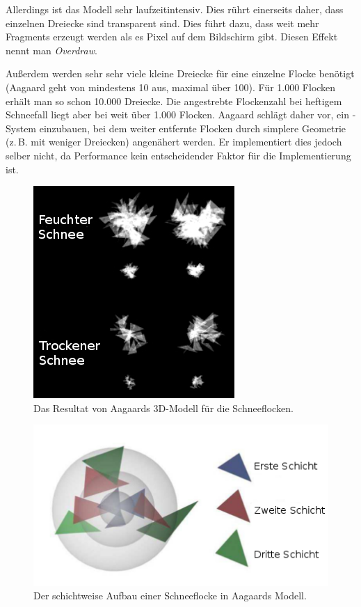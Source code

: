 Allerdings ist das Modell sehr laufzeitintensiv. Dies rührt einerseits
daher, dass einzelnen Dreiecke sind transparent sind. Dies führt dazu,
dass weit mehr Fragments erzeugt werden als es Pixel auf dem
Bildschirm gibt. Diesen Effekt nennt man \emph{Overdraw}.

Außerdem werden sehr sehr viele kleine Dreiecke für eine einzelne
Flocke benötigt (Aagaard geht von mindestens 10 aus, maximal über
100). Für 1.000 Flocken erhält man so schon 10.000 Dreiecke. Die
angestrebte Flockenzahl bei heftigem Schneefall liegt aber bei weit
über 1.000 Flocken. Aagaard schlägt daher vor, ein -System einzubauen, bei dem weiter entfernte Flocken durch
simplere Geometrie (z.\,B. mit weniger Dreiecken) angenähert werden. Er
implementiert dies jedoch selber nicht, da Performance kein
entscheidender Faktor für die Implementierung ist.

\begin{figure}[ht]
    \centering
    \includegraphics{images/aagaard_layer_model}
    \caption{Das Resultat von Aagaards 3D-Modell für die Schneeflocken.}
    \label{fig:implementation_aagaard_layer_model}
\end{figure}

\begin{figure}[ht]
    \centering
    \includegraphics{images/aagaard_spheres}
    \caption{Der schichtweise Aufbau einer Schneeflocke in Aagaards Modell.}
    \label{fig:implementation_aagaard_spheres}
\end{figure}

